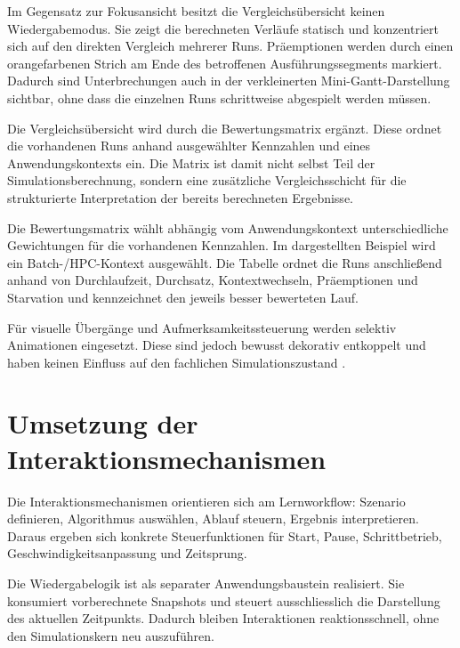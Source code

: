 Im Gegensatz zur Fokusansicht besitzt die Vergleichsübersicht keinen Wiedergabemodus. Sie zeigt die berechneten Verläufe statisch und konzentriert sich auf den direkten Vergleich mehrerer Runs. Präemptionen werden durch einen orangefarbenen Strich am Ende des betroffenen Ausführungssegments markiert. Dadurch sind Unterbrechungen auch in der verkleinerten Mini-Gantt-Darstellung sichtbar, ohne dass die einzelnen Runs schrittweise abgespielt werden müssen.

Die Vergleichsübersicht wird durch die Bewertungsmatrix ergänzt. Diese ordnet die vorhandenen Runs anhand ausgewählter Kennzahlen und eines Anwendungskontexts ein. Die Matrix ist damit nicht selbst Teil der Simulationsberechnung, sondern eine zusätzliche Vergleichsschicht für die strukturierte Interpretation der bereits berechneten Ergebnisse.



Die Bewertungsmatrix wählt abhängig vom Anwendungskontext unterschiedliche Gewichtungen für die vorhandenen Kennzahlen. Im dargestellten Beispiel wird ein Batch-/HPC-Kontext ausgewählt. Die Tabelle ordnet die Runs anschließend anhand von Durchlaufzeit, Durchsatz, Kontextwechseln, Präemptionen und Starvation und kennzeichnet den jeweils besser bewerteten Lauf.



\FloatBarrier

Für visuelle Übergänge und Aufmerksamkeitssteuerung werden selektiv Animationen eingesetzt. Diese sind jedoch bewusst dekorativ entkoppelt und haben keinen Einfluss auf den fachlichen Simulationszustand \cite{gsap}.

\section{Umsetzung der Interaktionsmechanismen}

Die Interaktionsmechanismen orientieren sich am Lernworkflow: Szenario definieren, Algorithmus auswählen, Ablauf steuern, Ergebnis interpretieren. Daraus ergeben sich konkrete Steuerfunktionen für Start, Pause, Schrittbetrieb, Geschwindigkeitsanpassung und Zeitsprung.

Die Wiedergabelogik ist als separater Anwendungsbaustein realisiert. Sie konsumiert vorberechnete Snapshots und steuert ausschliesslich die Darstellung des aktuellen Zeitpunkts. Dadurch bleiben Interaktionen reaktionsschnell, ohne den Simulationskern neu auszuführen.

